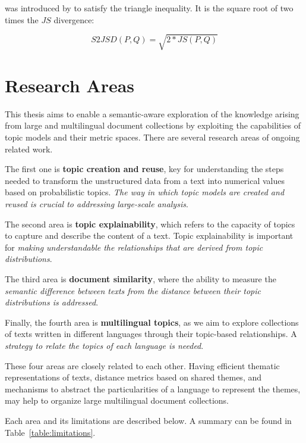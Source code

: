  was introduced by \citep{Endres2003} to satisfy the triangle inequality. It is the square root of two times the $JS$ divergence:

\begin{equation}
    S2JSD(P,Q) = \sqrt{2*JS(P,Q)}
\label{eq:s2jsd}
\end{equation}

\section{Research Areas}

This thesis aims to enable a semantic-aware exploration of the knowledge arising from large and multilingual document collections by exploiting the capabilities of topic models and their metric spaces. There are several research areas of ongoing related work. 

The first one is \textbf{topic creation and reuse}, key for understanding the steps needed to transform the unstructured data from a text into numerical values based on probabilistic topics. \textit{The way in which topic models are created and reused is crucial to addressing large-scale analysis}. 

The second area is \textbf{topic explainability}, which refers to the capacity of topics to capture and describe the content of a text. Topic explainability is important for \textit{making understandable the relationships that are derived from topic distributions}. 

The third area is \textbf{document similarity}, where the ability to measure the \textit{semantic difference between texts from the distance between their topic distributions is addressed}. 

Finally, the fourth area is \textbf{multilingual topics}, as we aim to explore collections of texts written in different languages through their topic-based relationships. A \textit{strategy to relate the topics of each language is needed}. 

These four areas are closely related to each other. Having efficient thematic representations of texts, distance metrics based on shared themes, and mechanisms to abstract the particularities of a language to represent the themes, may help to organize large multilingual document collections.

Each area and its limitations are described below. A summary can be found in Table~\ref{table:limitations}.

